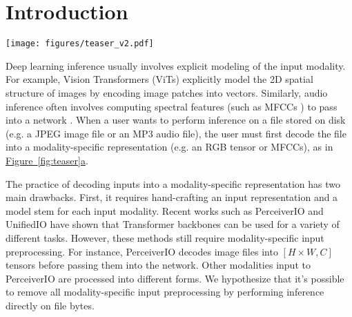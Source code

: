 \newcommand{\autorefsubfig}[2]{\hyperref[#1]{Figure~\ref*{#1}#2}}

\section{Introduction}
\begin{figure*}[t!]
    \centering
    \texttt{[image: figures/teaser\_v2.pdf]}
    \caption{An overview of our ByteFormer (BF) compared to standard inference with DeiT \cite{deit}. (A): File bytes are read from disk and converted to an RGB tensor using a standard image decoder. A patch embedding creates tokens from the RGB representation. (B): File bytes on disk are directly used as tokens, and projected into learned embeddings. (C): Similar to (B), but we apply an obfuscation function $\phi$. (D): We  capture a privacy-preserving representation with a custom camera, and perform token embedding from this representation.
    }
    \label{fig:teaser}
\end{figure*}

Deep learning inference usually involves explicit modeling of the input modality. For example, Vision Transformers (ViTs) \cite{vit} explicitly model the 2D spatial structure of images by encoding image patches into vectors. Similarly, audio inference often involves computing spectral features (such as MFCCs \cite{mfcc}) to pass into a network \cite{ast,bcresnet}. When a user wants to perform inference on a file stored on disk (e.g. a JPEG image file or an MP3 audio file), the user must first decode the file into a modality-specific representation (e.g. an RGB tensor or MFCCs), as in \autorefsubfig{fig:teaser}{a}.

The practice of decoding inputs into a modality-specific representation has two main drawbacks. First, it requires hand-crafting an input representation and a model stem for each input modality. Recent works such as PerceiverIO \cite{perceiverio} and UnifiedIO \cite{unifiedio} have shown that Transformer backbones can be used for a variety of different tasks. However, these methods still require modality-specific input preprocessing. For instance, PerceiverIO decodes image files into $[H\times W, C]$ tensors before passing them into the network. Other modalities input to PerceiverIO are processed into different forms. We hypothesize that it's possible to remove all modality-specific input preprocessing by performing inference directly on file bytes.

